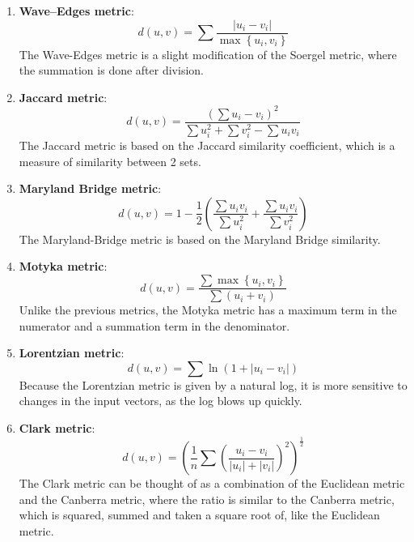 \documentclass[conference]{IEEEtran}
\begin{document}
\begin{enumerate}
    \item \textbf{Wave–Edges metric}:\\
    \begin{equation} \label{eq:wave_edges_metric}
        d(u,v)=\sum \frac{\left|u_{i}-v_{i}\right|}{\max \left\{u_{i}, v_{i}\right\}}
    \end{equation}
    The Wave-Edges metric is a slight modification of the Soergel metric, where the summation is done after division.

    \item \textbf{Jaccard metric}:\\
    \begin{equation} \label{eq:jaccard_metric}
        d(u,v)=\frac{\left(\sum u_{i}-v_{i}\right)^{2}}{\sum u_{i}^{2}+\sum v_{i}^{2}-\sum u_{i} v_{i}}
    \end{equation}
    The Jaccard metric is based on the Jaccard similarity coefficient, which is a measure of similarity between 2 sets.

    \item \textbf{Maryland Bridge metric}:\\
    \begin{equation} \label{eq:maryland_bridge_metric}
        d(u,v)=1-\frac{1}{2}\left(\frac{\sum u_{i} v_{i}}{\sum u_{i}^{2}}+\frac{\sum u_{i} v_{i}}{\sum v_{i}^{2}}\right)
    \end{equation}
    The Maryland-Bridge metric is based on the Maryland Bridge similarity.

    \item \textbf{Motyka metric}:\\
    \begin{equation} \label{eq:motyka_metric}
        d(u,v)=\frac{\sum \max \left\{u_{i}, v_{i}\right\}}{\sum\left(u_{i}+v_{i}\right)}
    \end{equation}
    Unlike the previous metrics, the Motyka metric has a maximum term in the numerator and a summation term in the denominator.

    \item \textbf{Lorentzian metric}:\\
    \begin{equation} \label{eq:lorentzian_metric}
        d(u,v)=\sum \ln \left(1+\left|u_{i}-v_{i}\right|\right)
    \end{equation}
    Because the Lorentzian metric is given by a natural log, it is more sensitive to changes in the input vectors, as the log blows up quickly.

    \item \textbf{Clark metric}:\\
    \begin{equation} \label{eq:clark_metric}
        d(u,v)=\left(\frac{1}{n} \sum\left(\frac{u_{i}-v_{i}}{\left|u_{i}\right|+\left|v_{i}\right|}\right)^{2}\right)^{\frac{1}{2}}
    \end{equation}
    The Clark metric can be thought of as a combination of the Euclidean metric and the Canberra metric, where the ratio is similar to the Canberra metric, which is squared, summed and taken a square root of, like the Euclidean metric.


\end{enumerate}
\end{document}
